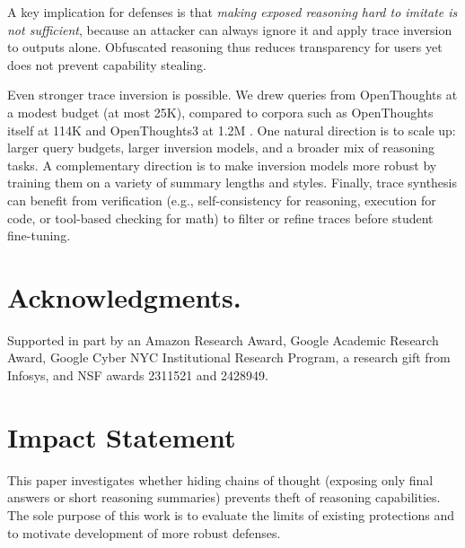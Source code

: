 \documentclass{article}
\begin{document}
A key implication for defenses is that \emph{making exposed reasoning hard to imitate is not sufficient}, because an attacker can always ignore it and apply trace inversion to outputs alone. Obfuscated reasoning thus reduces transparency for users yet does not prevent capability stealing. 

Even stronger trace inversion is possible. We drew queries from OpenThoughts at a modest budget (at most 25K), compared to corpora such as OpenThoughts itself at 114K and OpenThoughts3 at 1.2M \citep{guha2025openthoughtsdatarecipesreasoning}. 
One natural direction is to scale up: larger query budgets, larger inversion models, and a broader mix of reasoning tasks. A complementary direction is to make inversion models more robust by training them on a variety of summary lengths and styles. Finally, trace synthesis can benefit from  verification (e.g., self-consistency for reasoning, execution for code, or tool-based checking for math) to filter or refine traces before student fine-tuning.

 

\section*{Acknowledgments.}
Supported in part by an Amazon Research Award, Google Academic Research Award, Google Cyber NYC Institutional Research Program, a research gift from Infosys, and NSF awards 2311521 and 2428949.


\section*{Impact Statement}
\label{sec:impact-statement}
This paper investigates whether hiding chains of thought (exposing only final answers or short reasoning summaries) prevents theft of reasoning capabilities. The sole purpose of this work is to evaluate the limits of existing protections and to motivate development of more robust defenses.

\newpage
\appendix



% 
\end{document}
